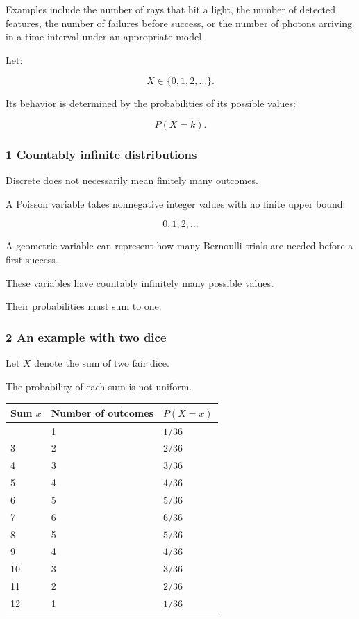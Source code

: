Examples include the number of rays that hit a light, the number of detected features, the number of failures before success, or the number of photons arriving in a time interval under an appropriate model.

Let:

\[
 X\in\{0,1,2,\ldots\}.
\]

Its behavior is determined by the probabilities of its possible values:

\[
 P(X=k).
\]

\subsubsection{1 Countably infinite distributions}\label{02-foundations-ii-ch023-countably-infinite-distributions}

Discrete does not necessarily mean finitely many outcomes.

A Poisson variable takes nonnegative integer values with no finite upper bound:

\[
 0,1,2,\ldots
\]

A geometric variable can represent how many Bernoulli trials are needed before a first success.

These variables have countably infinitely many possible values.

Their probabilities must sum to one.

\subsubsection{2 An example with two dice}\label{02-foundations-ii-ch023-an-example-with-two-dice}

Let \(X\) denote the sum of two fair dice.

The probability of each sum is not uniform.

{\def\LTcaptype{none} %
\begin{longtable}[]{@{}lll@{}}
\toprule\noalign{}
Sum \(x\) & Number of outcomes & \(P(X=x)\) \\
\midrule\noalign{}
\endhead
\bottomrule\noalign{}
\endlastfoot
2 & 1 & \(1/36\) \\
3 & 2 & \(2/36\) \\
4 & 3 & \(3/36\) \\
5 & 4 & \(4/36\) \\
6 & 5 & \(5/36\) \\
7 & 6 & \(6/36\) \\
8 & 5 & \(5/36\) \\
9 & 4 & \(4/36\) \\
10 & 3 & \(3/36\) \\
11 & 2 & \(2/36\) \\
12 & 1 & \(1/36\) \\
\end{longtable}
}

